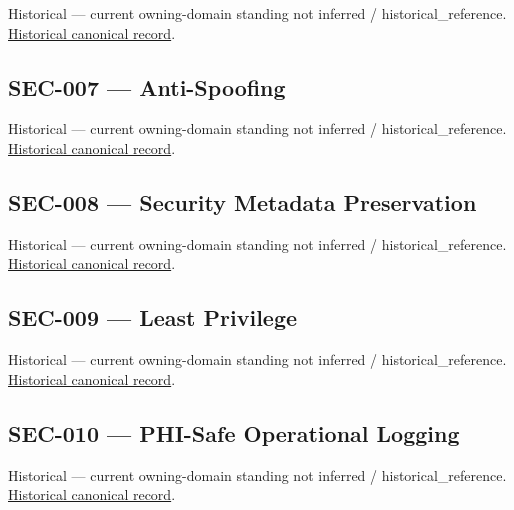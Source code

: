 \par\label{element:5eaac47ebef94bbb818e4ba751601ab1}
Historical — current owning-domain standing not inferred / historical\_reference. \href{../../../../continuum/motivation/requirement/5eaac47ebef94bbb818e4ba751601ab1.md}{Historical canonical record}.\par

\subsection{SEC-007 — Anti-Spoofing}

\par\label{element:8996bdd1790e4efeb78bedb85269c916}
Historical — current owning-domain standing not inferred / historical\_reference. \href{../../../../continuum/motivation/requirement/8996bdd1790e4efeb78bedb85269c916.md}{Historical canonical record}.\par

\subsection{SEC-008 — Security Metadata Preservation}

\par\label{element:c037846f015645728b4afe4d011ae0cd}
Historical — current owning-domain standing not inferred / historical\_reference. \href{../../../../continuum/motivation/requirement/c037846f015645728b4afe4d011ae0cd.md}{Historical canonical record}.\par

\subsection{SEC-009 — Least Privilege}

\par\label{element:f760e0cc08354fc88c8da049958b45ed}
Historical — current owning-domain standing not inferred / historical\_reference. \href{../../../../continuum/motivation/requirement/f760e0cc08354fc88c8da049958b45ed.md}{Historical canonical record}.\par

\subsection{SEC-010 — PHI-Safe Operational Logging}

\par\label{element:4a078bd44e874a48abc650f87d64f16f}
Historical — current owning-domain standing not inferred / historical\_reference. \href{../../../../continuum/motivation/requirement/4a078bd44e874a48abc650f87d64f16f.md}{Historical canonical record}.\par

